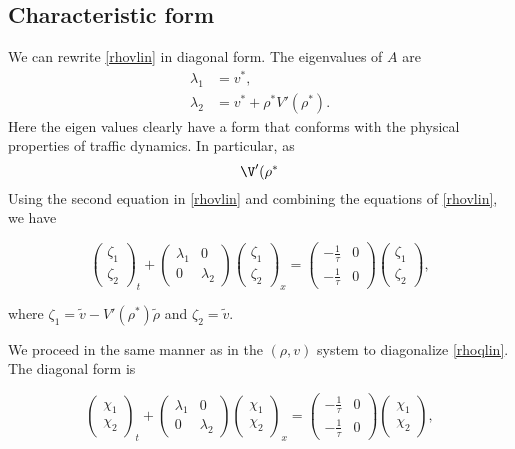 \documentclass[review]{elsarticle}
\begin{document}
\subsection{Characteristic form}
We can rewrite \eqref{rhovlin} in diagonal form. The eigenvalues of $A$ are 
\begin{align}
\lambda_1 &= v^*, \\
\lambda_2 &= v^* + \rho^* V'( \rho^*).
\end{align}
Here the eigen values clearly have a form that conforms with the physical properties of traffic dynamics. In particular, as \begin{equation}
\V'(\rho^*
\end{equation}
Using the second equation in \eqref{rhovlin} and combining the equations of \eqref{rhovlin}, we have

\begin{equation}
\begin{pmatrix}
\zeta_1 \\ \zeta_2
\end{pmatrix}_t
+ \begin{pmatrix}
\lambda_1 & 0 \\
0 & \lambda_2 
\end{pmatrix}
\begin{pmatrix}
\zeta_1 \\ \zeta_2
\end{pmatrix}_x
= \begin{pmatrix}
-\frac{1}{\tau} & 0 \\
-\frac{1}{\tau} & 0
\end{pmatrix}
\begin{pmatrix}
\zeta_1 \\ \zeta_2
\end{pmatrix},
\end{equation}

where $\zeta_1 = \tilde{v} - V'( \rho^* )\tilde{\rho}$ and $\zeta_2 = \tilde{v}$. 

We proceed in the same manner as in the $(\rho, v)$ system to diagonalize \eqref{rhoqlin}. The diagonal form is

\begin{equation} \label{rhoqlindiag}
\begin{pmatrix}
\chi_1 \\ \chi_2
\end{pmatrix}_t 
+ \begin{pmatrix}
\lambda_1 & 0 \\
0 & \lambda_2
\end{pmatrix}
\begin{pmatrix}
\chi_1 \\ \chi_2
\end{pmatrix}_x
= \begin{pmatrix}
-\frac{1}{\tau} & 0 \\
-\frac{1}{\tau} & 0
\end{pmatrix}
\begin{pmatrix}
\chi_1 \\ \chi_2
\end{pmatrix},
\end{equation}
\end{document}
